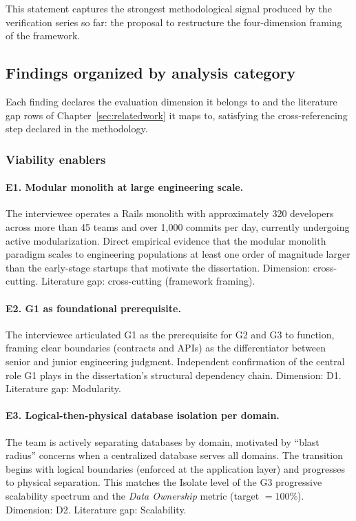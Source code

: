 This statement captures the strongest methodological signal produced by the verification series so far: the proposal to restructure the four-dimension framing of the framework.

\subsection*{Findings organized by analysis category}

Each finding declares the evaluation dimension it belongs to and the literature gap rows of Chapter~\ref{sec:relatedwork} it maps to, satisfying the cross-referencing step declared in the methodology.

\subsubsection*{Viability enablers}

\paragraph*{E1. Modular monolith at large engineering scale.} The interviewee operates a Rails monolith with approximately 320 developers across more than 45 teams and over 1{,}000 commits per day, currently undergoing active modularization. Direct empirical evidence that the modular monolith paradigm scales to engineering populations at least one order of magnitude larger than the early-stage startups that motivate the dissertation. Dimension: cross-cutting. Literature gap: cross-cutting (framework framing).

\paragraph*{E2. G1 as foundational prerequisite.} The interviewee articulated G1 as the prerequisite for G2 and G3 to function, framing clear boundaries (contracts and APIs) as the differentiator between senior and junior engineering judgment. Independent confirmation of the central role G1 plays in the dissertation's structural dependency chain. Dimension: D1. Literature gap: Modularity.

\paragraph*{E3. Logical-then-physical database isolation per domain.} The team is actively separating databases by domain, motivated by ``blast radius'' concerns when a centralized database serves all domains. The transition begins with logical boundaries (enforced at the application layer) and progresses to physical separation. This matches the Isolate level of the G3 progressive scalability spectrum and the \emph{Data Ownership} metric (target $= 100\%$). Dimension: D2. Literature gap: Scalability.

